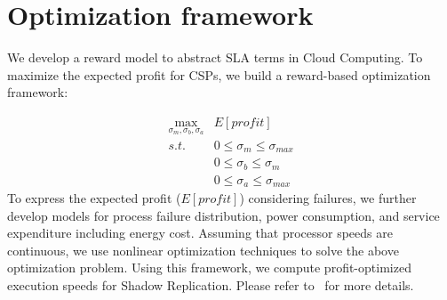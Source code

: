 %

\section{Optimization framework}

We develop a reward model to abstract SLA terms in Cloud Computing. To maximize the expected profit for CSPs, we build a reward-based optimization framework:  

\begin{equation}
\label{optimization_problem}
\begin{alignedat}{2}
\max_{\sigma_m,\sigma_b,\sigma_a}     & E[profit] \\
s.t.                                 & 0 \leq \sigma_m \leq \sigma_{max} \\
                                     & 0 \leq \sigma_b \leq \sigma_{m} \\
                                     & 0 \leq \sigma_a \leq \sigma_{max} 
\end{alignedat}
\end{equation}
To express the expected profit ($E[profit]$) considering failures, we further develop models for process failure distribution, power consumption, and service expenditure including energy cost.
Assuming that processor
speeds are continuous, we use nonlinear optimization techniques
to solve the above optimization problem. 
Using this framework, we compute profit-optimized execution speeds for Shadow Replication. 
Please refer to~\cite{cui_2014_closer} for more details.


